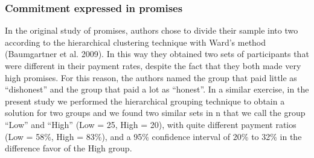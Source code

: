\documentclass[smallextended]{svjour3}       %
\begin{document}
\hypertarget{commitment-expressed-in-promises}{%
\subsubsection{Commitment expressed in
promises}\label{commitment-expressed-in-promises}}

In the original study of promises, authors chose to divide their sample
into two according to the hierarchical clustering technique with Ward's
method (Baumgartner et al. 2009). In this way they obtained two sets of
participants that were different in their payment rates, despite the
fact that they both made very high promises. For this reason, the
authors named the group that paid little as ``dishonest'' and the group
that paid a lot as ``honest''. In a similar exercise, in the present
study we performed the hierarchical grouping technique to obtain a
solution for two groups and we found two similar sets in n that we call
the group ``Low'' and ``High'' (Low = 25, High = 20), with quite
different payment ratios (Low = 58\%, High = 83\%), and a 95\%
confidence interval of 20\% to 32\% in the difference favor of the High
group.
\end{document}
